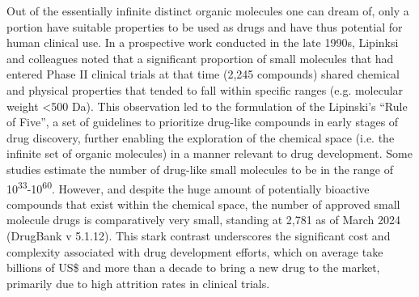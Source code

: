 Out of the essentially infinite distinct organic molecules one can dream of, only a portion have suitable properties to be used as drugs and have thus potential for human clinical use. In a prospective work conducted in the late 1990s, Lipinksi and colleagues noted that a significant proportion of small molecules that had entered Phase II clinical trials at that time (2,245 compounds) shared chemical and physical properties that tended to fall within specific ranges (e.g. molecular weight <500 Da)\cite{lipinski_experimental_2001}. This observation led to the formulation of the Lipinski's “Rule of Five”, a set of guidelines to prioritize drug-like compounds in early stages of drug discovery, further enabling the exploration of the chemical space (i.e. the infinite set of organic molecules) in a manner relevant to drug development\cite{lipinski_navigating_2004, dobson_chemical_2004, reymond_chemical_2010}. Some studies estimate the number of drug-like small molecules to be in the range of 10\textsuperscript{33}-10\textsuperscript{60}\cite{bohacek_art_1996, polishchuk_estimation_2013}. However, and despite the huge amount of potentially bioactive compounds that exist within the chemical space, the number of approved small molecule drugs is comparatively very small, standing at 2,781 as of March 2024 (DrugBank\cite{knox_drugbank_2024} v 5.1.12). This stark contrast underscores the significant cost and complexity associated with drug development efforts, which on average take billions of US\$ and more than a decade to bring a new drug to the market\cite{wouters_estimated_2020, sertkaya_costs_2024, dimasi_innovation_2016, hinkson_accelerating_2020, dimasi_research_2020}, primarily due to high attrition rates in clinical trials\cite{sun_why_2022}. 

